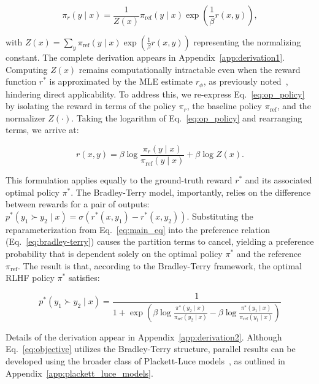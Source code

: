 \begin{equation}\label{eq:op_policy}
    \pi_r(y\mid x) = \frac{1}{Z(x)}\pi_\text{ref}(y\mid x)\exp\left(\frac{1}{\beta}r(x, y)\right),
\end{equation}

with $Z(x) = \sum_{y} \pi_\text{ref}(y\mid x) \exp\left(\frac{1}{\beta} r(x, y)\right)$ representing the normalizing constant. The complete derivation appears in Appendix~\ref{app:derivation1}. Computing $Z(x)$ remains computationally intractable even when the reward function $r^*$ is approximated by the MLE estimate $r_{\phi}$, as previously noted~\citep{korbak2022reinforcement, go2023aligning}, hindering direct applicability. To address this, we re-express Eq.~\ref{eq:op_policy} by isolating the reward in terms of the policy $\pi_r$, the baseline policy $\pi_\text{ref}$, and the normalizer $Z(\cdot)$. Taking the logarithm of Eq.~\ref{eq:op_policy} and rearranging terms, we arrive at:

\begin{equation}\label{eq:main_eq}
    r(x,y) = \beta \log \frac{\pi_r(y\mid x)}{\pi_\text{ref}(y\mid x)} + \beta \log Z(x).
\end{equation}

This formulation applies equally to the ground-truth reward $r^*$ and its associated optimal policy $\pi^*$. The Bradley-Terry model, importantly, relies on the difference between rewards for a pair of outputs: ${p^*(y_1 \succ y_2 \mid x) = \sigma(r^*(x, y_1) - r^*(x, y_2))}$. Substituting the reparameterization from Eq.~\ref{eq:main_eq} into the preference relation (Eq.~\ref{eq:bradley-terry}) causes the partition terms to cancel, yielding a preference probability that is dependent solely on the optimal policy $\pi^*$ and the reference $\pi_\text{ref}$. The result is that, according to the Bradley-Terry framework, the optimal RLHF policy $\pi^*$ satisfies:

\begin{equation}\label{eq:objective}
    p^*(y_1\succ y_2 \mid x)=\frac{1}{1 + \exp\left(\beta \log \frac{\pi^*(y_2\mid x)}{\pi_\text{ref}(y_2\mid x)} - \beta \log \frac{\pi^*(y_1\mid x)}{\pi_\text{ref}(y_1\mid x)}\right)}
\end{equation}

Details of the derivation appear in Appendix~\ref{app:derivation2}. Although Eq.~\ref{eq:objective} utilizes the Bradley-Terry structure, parallel results can be developed using the broader class of Plackett-Luce models~\citep{plackett1975analysis, luce2012individual}, as outlined in Appendix~\ref{app:plackett_luce_models}.


